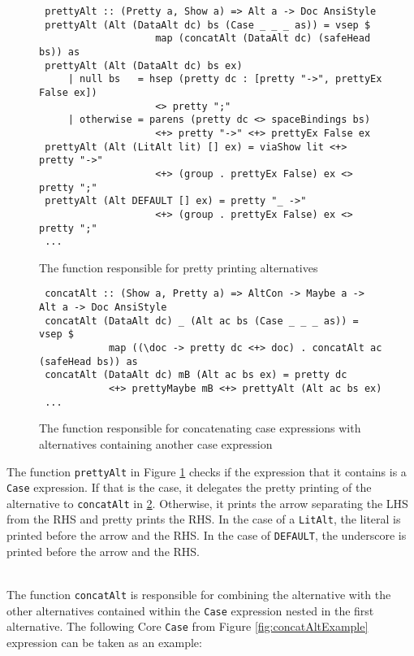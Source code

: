 \begin{figure}[!ht]
\begin{verbatim}
 prettyAlt :: (Pretty a, Show a) => Alt a -> Doc AnsiStyle
 prettyAlt (Alt (DataAlt dc) bs (Case _ _ _ as)) = vsep $
                    map (concatAlt (DataAlt dc) (safeHead bs)) as
 prettyAlt (Alt (DataAlt dc) bs ex)
     | null bs   = hsep (pretty dc : [pretty "->", prettyEx False ex])
                    <> pretty ";"
     | otherwise = parens (pretty dc <> spaceBindings bs)
                    <+> pretty "->" <+> prettyEx False ex
 prettyAlt (Alt (LitAlt lit) [] ex) = viaShow lit <+> pretty "->"
                    <+> (group . prettyEx False) ex <> pretty ";"
 prettyAlt (Alt DEFAULT [] ex) = pretty "_ ->"
                    <+> (group . prettyEx False) ex <> pretty ";"
 ...
\end{verbatim}
    \caption{The function responsible for pretty printing alternatives}
    \label{fig:prettyAlt}
\end{figure}

\begin{figure}[!ht]
\begin{verbatim}
 concatAlt :: (Show a, Pretty a) => AltCon -> Maybe a -> Alt a -> Doc AnsiStyle
 concatAlt (DataAlt dc) _ (Alt ac bs (Case _ _ _ as)) = vsep $
            map ((\doc -> pretty dc <+> doc) . concatAlt ac (safeHead bs)) as
 concatAlt (DataAlt dc) mB (Alt ac bs ex) = pretty dc
            <+> prettyMaybe mB <+> prettyAlt (Alt ac bs ex)
 ...
\end{verbatim}
    \caption{The function responsible for concatenating case expressions with alternatives containing another case expression}
    \label{fig:concatAlt}
\end{figure}

The function \texttt{prettyAlt} in Figure \ref*{fig:prettyAlt} checks if the expression that it contains is a \texttt{Case} expression.
If that is the case, it delegates the pretty printing of the alternative to \texttt{concatAlt} in \ref*{fig:concatAlt}.
Otherwise, it prints the arrow separating the LHS from the RHS and pretty prints the RHS.
In the case of a \texttt{LitAlt}, the literal is printed before the arrow and the RHS.
In the case of \texttt{DEFAULT}, the underscore is printed before the arrow and the RHS.

\ \\
The function \texttt{concatAlt} is responsible for combining the alternative with the other alternatives contained within the \texttt{Case} expression nested in the first alternative.
The following Core \texttt{Case} from Figure \ref*{fig:concatAltExample} expression can be taken as an example:

